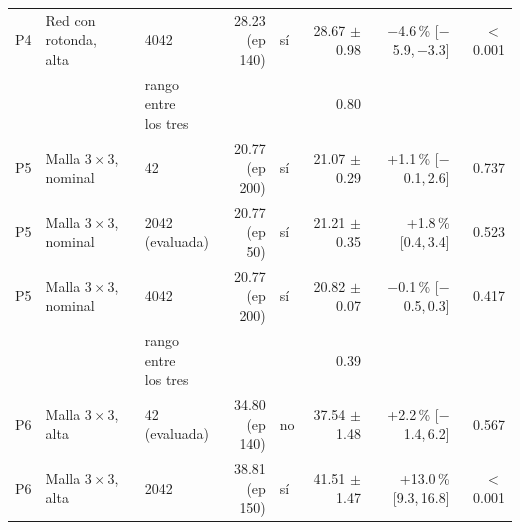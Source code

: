 \begin{table}[H]
\begin{tabular}{lllrlrrr}
P4 & \makecell[l]{Red con rotonda,\\{}alta} & 4042 & \makecell[r]{28.23\\{}(ep 140)} & sí & \makecell[r]{28.67\\{}$\pm$ 0.98} & \makecell[r]{$-$4.6\,\%\\{}[$-$5.9,\,$-$3.3]} & $<$\,0.001 \\
 & & \makecell[l]{rango entre\\{}los tres} & & & 0.80 & & \\
P5 & \makecell[l]{Malla $3 \times 3$,\\{}nominal} & 42 & \makecell[r]{20.77\\{}(ep 200)} & sí & \makecell[r]{21.07\\{}$\pm$ 0.29} & \makecell[r]{+1.1\,\%\\{}[$-$0.1,\,2.6]} & 0.737 \\
P5 & \makecell[l]{Malla $3 \times 3$,\\{}nominal} & \makecell[l]{2042\\{}(evaluada)} & \makecell[r]{20.77\\{}(ep 50)} & sí & \makecell[r]{21.21\\{}$\pm$ 0.35} & \makecell[r]{+1.8\,\%\\{}[0.4,\,3.4]} & 0.523 \\
P5 & \makecell[l]{Malla $3 \times 3$,\\{}nominal} & 4042 & \makecell[r]{20.77\\{}(ep 200)} & sí & \makecell[r]{20.82\\{}$\pm$ 0.07} & \makecell[r]{$-$0.1\,\%\\{}[$-$0.5,\,0.3]} & 0.417 \\
 & & \makecell[l]{rango entre\\{}los tres} & & & 0.39 & & \\
P6 & \makecell[l]{Malla $3 \times 3$,\\{}alta} & \makecell[l]{42\\{}(evaluada)} & \makecell[r]{34.80\\{}(ep 140)} & no & \makecell[r]{37.54\\{}$\pm$ 1.48} & \makecell[r]{+2.2\,\%\\{}[$-$1.4,\,6.2]} & 0.567 \\
P6 & \makecell[l]{Malla $3 \times 3$,\\{}alta} & 2042 & \makecell[r]{38.81\\{}(ep 150)} & sí & \makecell[r]{41.51\\{}$\pm$ 1.47} & \makecell[r]{+13.0\,\%\\{}[9.3,\,16.8]} & $<$\,0.001 \\

\end{tabular}
\end{table}
